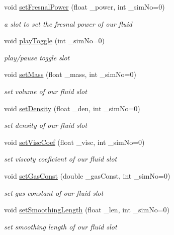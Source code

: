 \begin{DoxyCompactItemize}
void \hyperlink{class_open_g_l_widget_adc34d0b2bed5d7a7f2d5b92fa1b82889}{set\-Fresnal\-Power} (float \-\_\-power, int \-\_\-sim\-No=0)
\begin{DoxyCompactList}\small\item\em a slot to set the fresnal power of our fluid \end{DoxyCompactList}\item 
void \hyperlink{class_open_g_l_widget_a2d1d9bb18d20f1479cb86e832ab17fd2}{play\-Toggle} (int \-\_\-sim\-No=0)
\begin{DoxyCompactList}\small\item\em play/pause toggle slot \end{DoxyCompactList}\item 
void \hyperlink{class_open_g_l_widget_a84585fd40a1fad03bbd118436f5fc477}{set\-Mass} (float \-\_\-mass, int \-\_\-sim\-No=0)
\begin{DoxyCompactList}\small\item\em set volume of our fluid slot \end{DoxyCompactList}\item 
void \hyperlink{class_open_g_l_widget_a785cd8493ea4c1a24a19a16835de4577}{set\-Density} (float \-\_\-den, int \-\_\-sim\-No=0)
\begin{DoxyCompactList}\small\item\em set density of our fluid slot \end{DoxyCompactList}\item 
void \hyperlink{class_open_g_l_widget_aad4c9ceaedc57507d3e9504d15dd8f4a}{set\-Visc\-Coef} (float \-\_\-visc, int \-\_\-sim\-No=0)
\begin{DoxyCompactList}\small\item\em set viscoty coeficient of our fluid slot \end{DoxyCompactList}\item 
void \hyperlink{class_open_g_l_widget_a806e81697e0c6bf0992696ab948bc1c5}{set\-Gas\-Const} (double \-\_\-gas\-Const, int \-\_\-sim\-No=0)
\begin{DoxyCompactList}\small\item\em set gas constant of our fluid slot \end{DoxyCompactList}\item 
void \hyperlink{class_open_g_l_widget_af0f0474b4ff16318e6cf2e7479b369c7}{set\-Smoothing\-Length} (float \-\_\-len, int \-\_\-sim\-No=0)
\begin{DoxyCompactList}\small\item\em set smoothing length of our fluid slot \end{DoxyCompactList}\item 

\end{DoxyCompactItemize}
